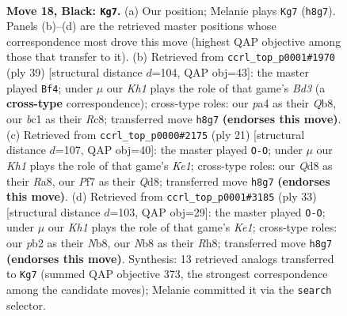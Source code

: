 \documentclass[11pt]{article}
\begin{document}
\clearpage

\begin{figure}[p]\centering
\begin{subfigure}{0.46\textwidth}\centering
\resizebox{\linewidth}{!}{%
\newchessgame
\chessboard[
  setfen={rn1qr2k/p2n1p1P/1p1p1b2/2pP2p1/P3P1P1/2NQ4/1P2N3/R1B1K2R b KQ - 2 18},
  showmover=false,
  pgfstyle=straightmove, color=movearrow, markmove={h8-g7}
]}
\caption{}
\end{subfigure}\hfill
\begin{subfigure}{0.46\textwidth}\centering
\resizebox{\linewidth}{!}{%
\newchessgame
\chessboard[
  setfen={1qr3k1/1b1n1pp1/p2bpn1p/1p6/1P2P3/P4N1P/1B1NQPP1/1B1R2K1 b - - 0 20},
  showmover=false,
  pgfstyle=straightmove, color=movearrow, markmove={d6-f4}
]}
\caption{}
\end{subfigure}
\\[4pt]
\begin{subfigure}{0.46\textwidth}\centering
\resizebox{\linewidth}{!}{%
\newchessgame
\chessboard[
  setfen={r2qk2r/p1p1nppp/1p1b4/3p1n2/2PP4/1Q3N2/PP3PPP/RNB1R1K1 b kq - 0 11},
  showmover=false,
  pgfstyle=straightmove, color=movearrow, markmove={e8-g8}
]}
\caption{}
\end{subfigure}\hfill
\begin{subfigure}{0.46\textwidth}\centering
\resizebox{\linewidth}{!}{%
\newchessgame
\chessboard[
  setfen={rnq1k2r/1b1n1pp1/4p2p/p1bpP3/3N1PPP/4B1K1/1PPQN3/R4B1R b kq - 3 17},
  showmover=false,
  pgfstyle=straightmove, color=movearrow, markmove={e8-g8}
]}
\caption{}
\end{subfigure}
\caption{\textbf{Move 18, Black: \texttt{Kg7}.} (a) Our position; Melanie plays \texttt{Kg7} (\texttt{h8g7}). Panels (b)--(d) are the retrieved master positions whose correspondence most drove this move (highest QAP objective among those that transfer to it). (b) Retrieved from \texttt{ccrl\_top\_p0001\#1970} (ply 39) [structural distance $d$=104, QAP obj=43]: the master played \texttt{Bf4}; under $\mu$ our \emph{Kh1} plays the role of that game's \emph{Bd3} (a \textbf{cross-type} correspondence); cross-type roles: our \emph{p}a4 as their \emph{Q}b8, our \emph{b}c1 as their \emph{R}c8; transferred move \texttt{h8g7} \textbf{(endorses this move)}. (c) Retrieved from \texttt{ccrl\_top\_p0000\#2175} (ply 21) [structural distance $d$=107, QAP obj=40]: the master played \texttt{O-O}; under $\mu$ our \emph{Kh1} plays the role of that game's \emph{Ke1}; cross-type roles: our \emph{Q}d8 as their \emph{R}a8, our \emph{P}f7 as their \emph{Q}d8; transferred move \texttt{h8g7} \textbf{(endorses this move)}. (d) Retrieved from \texttt{ccrl\_top\_p0001\#3185} (ply 33) [structural distance $d$=103, QAP obj=29]: the master played \texttt{O-O}; under $\mu$ our \emph{Kh1} plays the role of that game's \emph{Ke1}; cross-type roles: our \emph{p}b2 as their \emph{N}b8, our \emph{N}b8 as their \emph{R}h8; transferred move \texttt{h8g7} \textbf{(endorses this move)}. Synthesis: 13 retrieved analogs transferred to \texttt{Kg7} (summed QAP objective 373, the strongest correspondence among the candidate moves); Melanie committed it via the \texttt{search} selector.}
\label{fig:thought-m35}
\end{figure}
\end{document}
